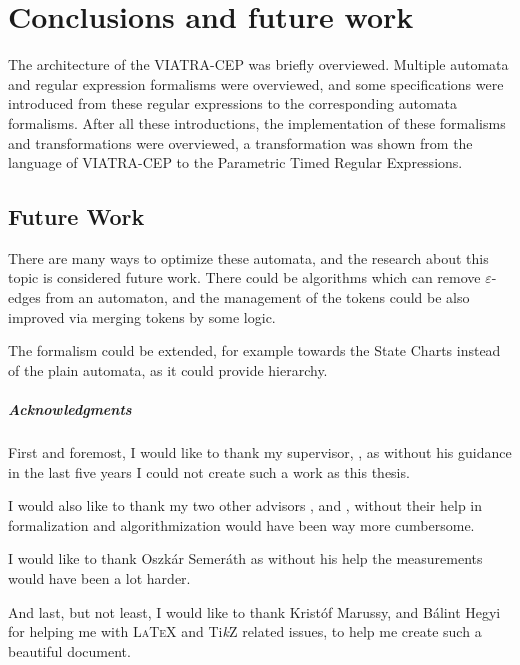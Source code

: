 \chapter{Conclusions and future work}

The architecture of the VIATRA-CEP was briefly overviewed.
Multiple automata and regular expression formalisms were overviewed, and some specifications were introduced from these regular expressions to the corresponding automata formalisms. 
After all these introductions, the implementation of these formalisms and transformations were overviewed, a transformation was shown from the language of VIATRA-CEP to the Parametric Timed Regular Expressions.



\section{Future Work}

There are many ways to optimize these automata, and the research about this topic is considered future work. 
There could be algorithms which can remove $\varepsilon$-edges from an automaton, and the management of the tokens could be also improved via merging tokens by some logic.

The formalism could be extended, for example towards the State Charts instead of the plain automata, as it could provide hierarchy. 

\paragraph*{Acknowledgments}
{}


First and foremost, I would like to thank my supervisor, \advisori, as without his guidance in the last five years I could not create such a work as this thesis.

I would also like to thank my two other advisors \advisorii, and \advisoriii, without their help in formalization and algorithmization would have been way more cumbersome.

I would like to thank Oszkár Semeráth as without his help the measurements would have been a lot harder.

And last, but not least, I would like to thank Kristóf Marussy, and Bálint Hegyi for helping me with L\textsc{a}T\textsc{e}X and Ti\emph{k}Z related issues, to help me create such a beautiful document.

